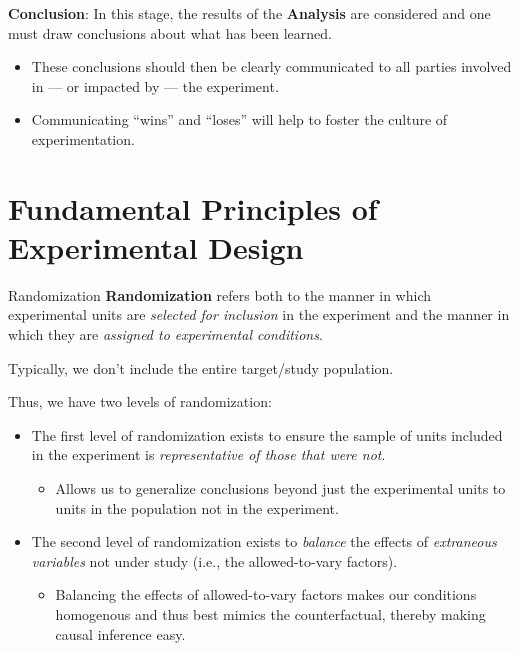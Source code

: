 \begin{framed}
    \textbf{Conclusion}: In this stage, the results of the \textbf{Analysis} are considered
    and one must draw conclusions about what has been learned.
    \begin{itemize}
        \item These conclusions should then be clearly communicated to all parties involved
              in --- or impacted by --- the experiment.
        \item Communicating ``wins'' and ``loses'' will help to foster the culture
              of experimentation.
    \end{itemize}
\end{framed}
\section{Fundamental Principles of Experimental Design}
\begin{Definition}{Randomization}{}
    \textbf{Randomization} refers both to the manner in which experimental units
    are \emph{selected for inclusion} in the experiment and the manner in which they
    are \emph{assigned to experimental conditions}.
\end{Definition}
\begin{Remark}{}{}
    Typically, we don't include the entire target/study population.
\end{Remark}
Thus, we have two levels of randomization:
\begin{itemize}
    \item The first level of randomization exists to ensure the sample of units included in
          the experiment is \emph{representative of those that were not}.
          \begin{itemize}
              \item Allows us to generalize conclusions beyond just the experimental units to units
                    in the population not in the experiment.
          \end{itemize}
    \item The second level of randomization exists to \emph{balance} the effects of \emph{extraneous variables}
          not under study (i.e., the allowed-to-vary factors).
          \begin{itemize}
              \item Balancing the effects of allowed-to-vary factors makes our conditions homogenous
                    and thus best mimics the counterfactual, thereby making causal inference easy.
          \end{itemize}
\end{itemize}

